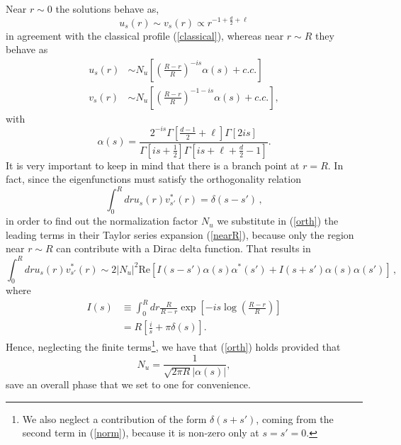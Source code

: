 \documentclass[12pt,a4paper]{article}
\begin{document}
Near $r\sim 0$ the solutions behave as,
\begin{equation}
u_s(r)\sim v_s(r)\propto r^{-1+\frac{d}{2}+\ell}
\end{equation}
in agreement with the classical profile (\ref{classical}), whereas near $r\sim R$ they behave as
\begin{equation}\label{nearR}
\begin{split}
u_s(r)&\sim N_u\left[\left( \frac{R-r}{R}\right)^{-i s}\alpha(s)+ c.c.\right]\\
v_s(r)&\sim N_u\left[\left( \frac{R-r}{R}\right)^{-1-i s}\alpha(s)+c.c.\right],
\end{split}
\end{equation}
with 
\begin{equation}
\alpha(s)=\frac{2^{-i s}\Gamma\left[\frac{d-1}{2}+\ell\right]\Gamma\left[2 i s\right]}{\Gamma\left[i s+\frac{1}{2}\right]\Gamma\left[i s+\ell+\frac{d}{2}-1\right]}.
\end{equation}
It is very important to keep in mind that there is a branch point at $r=R$. In fact, since the eigenfunctions must satisfy the orthogonality relation
\begin{equation}\label{orth}
\int_0^R dr u_s(r)v_{s'}^{*}(r)=\delta(s-s')\, ,
\end{equation}
in order to find out the normalization factor $N_u$ we substitute in (\ref{orth}) the leading terms in their Taylor series expansion (\ref{nearR}), because only the region near $r\sim R$ can contribute with a Dirac delta function. That results in
\begin{equation}\label{norm}
\int_0^R dr u_s(r)v_{s'}^{*}(r)\sim 2 \vert N_u\vert^2\text{Re}\left[ I(s-s') \alpha(s)\alpha^{*}(s')+ I(s+s') \alpha(s)\alpha(s')\right]\, ,
\end{equation}
where
\begin{equation}\label{Imenos}
\begin{split}
I(s)&\equiv\int_0^R dr \frac{R}{R-r}\exp{\left[-i s\log{\left(\frac{R-r}{R}\right)}\right]}\\
&=  R\left[\frac{i}{s}+\pi \delta(s)\right].
\end{split}
\end{equation}
Hence, neglecting the finite terms\footnote{We also neglect a contribution of the form $\delta(s+s')$, coming from the second term in (\ref{norm}), because it is non-zero only at $s=s'=0$.}, we have that (\ref{orth}) holds provided that
\begin{equation}
N_u=\frac{1}{\sqrt{2\pi R}\vert \alpha(s)\vert},
\end{equation}
save an overall phase that we set to one for convenience.
\end{document}
